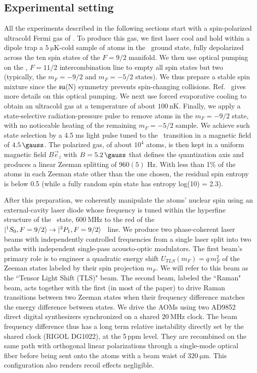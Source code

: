 \subsection{Experimental setting}
\label{Sec:ExperimentSetting}

All the experiments described in the following sections start with a spin-polarized ultracold Fermi gas of . To produce this gas, we first laser cool and hold within a dipole trap a $\SI{5}{\micro \kelvin}$-cold sample of atoms in the \StateOneSZeroLong~ground state, fully depolarized across the ten spin states of the $F = 9/2$ manifold. We then use optical pumping on the {\RedMotTransition, $F = 11/2$} intercombination line to empty all spin states but two (typically, the $m_F = -9/2$ and $m_F = -5/2$ states). We thus prepare a stable spin mixture since the $\mathfrak{su}$(N) symmetry prevents spin-changing collisions. Ref.~\cite{Bataille2020} gives more details on this optical pumping. We next use forced evaporative cooling to obtain an ultracold gas at a temperature of about $\SI{100}{\nano \kelvin}$. Finally, we apply a state-selective radiation-pressure pulse to remove atoms in the $m_F = -9/2$ state, with no noticeable heating of the remaining $m_F = -5/2$ sample. We achieve such state selection by a 4.5 ms light pulse tuned to the \RedBlastTransition~transition in a magnetic field of $ \SI{4.5}{\gauss}$. The polarized gas, of about $10^4$ atoms, is then kept in a uniform magnetic field $B \vec e_z$ with $B = \SI{5.2}{\gauss}$ that defines the quantization axis and produces a linear Zeeman splitting of $960 (5)$ Hz. With less than 1$\%$ of the atoms in each Zeeman state other than the one chosen, the residual spin entropy is below 0.5 (while a fully random spin state has entropy log(10) = 2.3). 

After this preparation, we coherently manipulate the atoms' nuclear spin using an external-cavity laser diode whose frequency is tuned within the hyperfine structure of the \StateThreePOne~state, $\SI{600}{\mega \hertz}$ to the red of the {$\ket{^1S_0, F=9/2} \rightarrow \ket{^3P_1, F=9/2}$ }~line. We produce two phase-coherent laser beams with independently controlled frequencies from a single laser split into two paths with independent single-pass acousto-optic modulators. The first beam's primary role is to engineer a quadratic energy shift $U_{TLS}(m_F) = q \, m_F^2$ of the Zeeman states labeled by their spin projection $m_F$. We will refer to this beam as the ``Tensor Light Shift (TLS)" beam. The second beam, labeled the ``Raman" beam, acts together with the first (in most of the paper) to drive Raman transitions between two Zeeman states when their frequency difference matches the energy difference between states. We drive the AOMs using two AD9852 direct digital synthesizers synchronized on a shared $\SI{20}{\mega \hertz}$ clock. The beam frequency difference thus has a long term relative instability directly set by the shared clock (RIGOL DG1022), at the {5\,ppm} level. They are recombined on the same path with orthogonal linear polarizations through a single-mode optical fiber before being sent onto the atoms with a beam waist of $\SI{320}{\micro \meter}$. This configuration also renders recoil effects negligible. 


